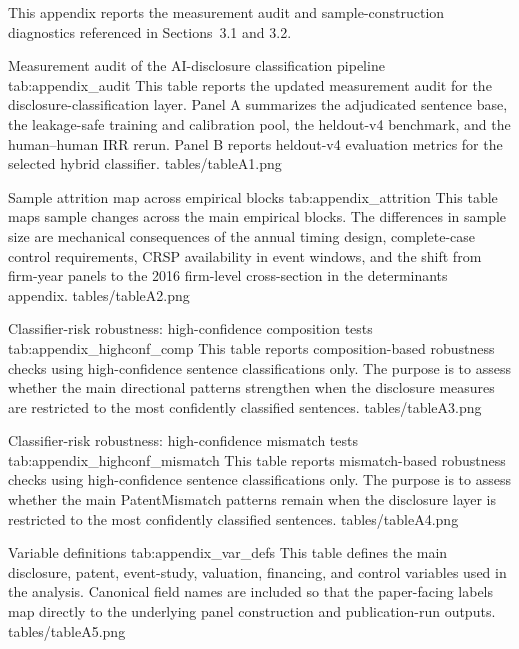 This appendix reports the measurement audit and sample-construction diagnostics referenced in Sections~3.1 and 3.2.

\apptablepdf
{Measurement audit of the AI-disclosure classification pipeline}
{tab:appendix_audit}
{This table reports the updated measurement audit for the disclosure-classification layer. Panel A summarizes the adjudicated sentence base, the leakage-safe training and calibration pool, the heldout-v4 benchmark, and the human--human IRR rerun. Panel B reports heldout-v4 evaluation metrics for the selected hybrid classifier.}
{tables/tableA1.png}

\apptablepdf
{Sample attrition map across empirical blocks}
{tab:appendix_attrition}
{This table maps sample changes across the main empirical blocks. The differences in sample size are mechanical consequences of the annual timing design, complete-case control requirements, CRSP availability in event windows, and the shift from firm-year panels to the 2016 firm-level cross-section in the determinants appendix.}
{tables/tableA2.png}

\apptablepdf
{Classifier-risk robustness: high-confidence composition tests}
{tab:appendix_highconf_comp}
{This table reports composition-based robustness checks using high-confidence sentence classifications only. The purpose is to assess whether the main directional patterns strengthen when the disclosure measures are restricted to the most confidently classified sentences.}
{tables/tableA3.png}

\apptablepdf
{Classifier-risk robustness: high-confidence mismatch tests}
{tab:appendix_highconf_mismatch}
{This table reports mismatch-based robustness checks using high-confidence sentence classifications only. The purpose is to assess whether the main PatentMismatch patterns remain when the disclosure layer is restricted to the most confidently classified sentences.}
{tables/tableA4.png}

\apptablepdf
{Variable definitions}
{tab:appendix_var_defs}
{This table defines the main disclosure, patent, event-study, valuation, financing, and control variables used in the analysis. Canonical field names are included so that the paper-facing labels map directly to the underlying panel construction and publication-run outputs.}
{tables/tableA5.png}